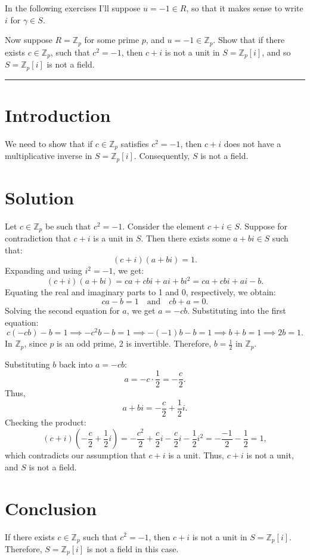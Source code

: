 \documentclass[12pt]{amsart}
\theoremstyle{definition}
\numberwithin{equation}{section}
\newcommand{\Z}{\mathbb{Z}}
\begin{document}
In the following exercises I'll suppose \(u = -1 \in R\), so that it makes sense to write \(i\) for \(\gamma \in S\).
\begin{exercise}{3} Now suppose \(R= \Z_p\) for some prime \(p\), and \(u = -1 \in \Z_p\). Show that if there exists \(c \in \Z_p\), such that \(c^2=-1\), then \(c+i\) is not a unit in \(S=\Z_p[i]\), and so \(S=\Z_p[i]\) is not a field. 

    \noindent\rule{\linewidth}{1pt}

    \section*{Introduction}
    We need to show that if \(c \in \Z_p\) satisfies \(c^2 = -1\), then \(c + i\) does not have a multiplicative inverse in \(S = \Z_p[i]\). Consequently, \(S\) is not a field.

    \section*{Solution}
    Let \(c \in \Z_p\) be such that \(c^2 = -1\). Consider the element \(c + i \in S\). Suppose for contradiction that \(c + i\) is a unit in \(S\). Then there exists some \(a + bi \in S\) such that:
    \[
    (c + i)(a + bi) = 1.
    \]
    Expanding and using \(i^2 = -1\), we get:
    \[
    (c + i)(a + bi) = ca + cbi + ai + bi^2 = ca + cbi + ai - b.
    \]
    Equating the real and imaginary parts to 1 and 0, respectively, we obtain:
    \[
    ca - b = 1 \quad \text{and} \quad cb + a = 0.
    \]
    Solving the second equation for \(a\), we get \(a = -cb\). Substituting into the first equation:
    \[
    c(-cb) - b = 1 \implies -c^2b - b = 1 \implies -(-1)b - b = 1 \implies b + b = 1 \implies 2b = 1.
    \]
    In \(\Z_p\), since \(p\) is an odd prime, 2 is invertible. Therefore, \(b = \frac{1}{2}\) in \(\Z_p\).

    Substituting \(b\) back into \(a = -cb\):
    \[
    a = -c \cdot \frac{1}{2} = -\frac{c}{2}.
    \]
    Thus,
    \[
    a + bi = -\frac{c}{2} + \frac{1}{2}i.
    \]
    Checking the product:
    \[
    (c + i)\left(-\frac{c}{2} + \frac{1}{2}i\right) = -\frac{c^2}{2} + \frac{c}{2}i - \frac{c}{2}i - \frac{1}{2}i^2 = -\frac{-1}{2} - \frac{1}{2} = 1,
    \]
    which contradicts our assumption that \(c + i\) is a unit. Thus, \(c + i\) is not a unit, and \(S\) is not a field.

    \section*{Conclusion}
    If there exists \(c \in \Z_p\) such that \(c^2 = -1\), then \(c + i\) is not a unit in \(S = \Z_p[i]\). Therefore, \(S = \Z_p[i]\) is not a field in this case.

\end{exercise}
\end{document}
